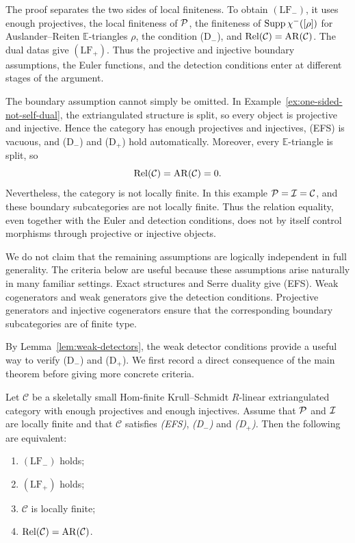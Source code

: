 \documentclass[11pt, twoside]{article}
\def\C{\mathcal{C}}
\def\E{\mathbb{E}}
\numberwithin{equation}{section}
\begin{document}
\begin{remark}\label{rem:role-hypotheses}
The proof separates the two sides of local finiteness.  To obtain
$(\mathrm{LF}_-)$, it uses enough projectives, the local finiteness of
$\mathcal{P}$, the finiteness of $\operatorname{Supp}\chi^-([\rho])$ for
Auslander--Reiten $\E$-triangles $\rho$, the condition (D$_-$), and
$\Rel(\C)=\AR(\C)$.  The dual datas give $(\mathrm{LF}_+)$.  Thus the
projective and injective boundary assumptions, the Euler functions, and the
detection conditions enter at different stages of the argument.

The boundary assumption cannot simply be omitted.  In
Example~\ref{ex:one-sided-not-self-dual}, the extriangulated structure is
split, so every object is projective and injective.  Hence the category has
enough projectives and injectives, (EFS) is vacuous, and
(D$_-$) and {(D$_+$)} hold automatically.  Moreover, every
$\E$-triangle is split, so
\[
 \Rel(\C)=\AR(\C)=0.
\]
Nevertheless, the category is not locally finite.  In this example
$\Pcal=\Ical=\C$, and these boundary subcategories are not locally
finite.  Thus the relation equality, even together with the Euler and
detection conditions, does not by itself control morphisms through
projective or injective objects.

We do not claim that the remaining assumptions are logically independent in full generality.  The criteria below are useful because these assumptions arise naturally in many familiar settings.  Exact structures and Serre duality give (EFS).  Weak cogenerators and weak generators give the detection conditions.  Projective generators and injective cogenerators ensure that the corresponding boundary subcategories are of finite type.
\end{remark}


By Lemma~\ref{lem:weak-detectors}, the weak detector conditions provide a useful way to verify
{(D$_-$)} and {(D$_+$)}. We first record a direct consequence of the main theorem before giving more concrete criteria.





\begin{corollary}\label{cor:one-sided-equivalence}
Let $\C$ be a skeletally small Hom-finite Krull--Schmidt $R$-linear
extriangulated category with enough projectives and enough injectives.  Assume
that $\mathcal{P}$ and $\mathcal{I}$ are locally finite and that $\C$ satisfies
\emph{(EFS)}, \emph{(D$_-$)} and \emph{(D$_+$)}.  Then the following are
equivalent:
\begin{enumerate}[label=\textup{(\arabic*)},leftmargin=2.7em]
\item $(\mathrm{LF}_-)$ holds;
\item $(\mathrm{LF}_+)$ holds;
\item $\C$ is locally finite;
\item $\Rel(\C)=\AR(\C)$.
\end{enumerate}
\end{corollary}
\end{document}
